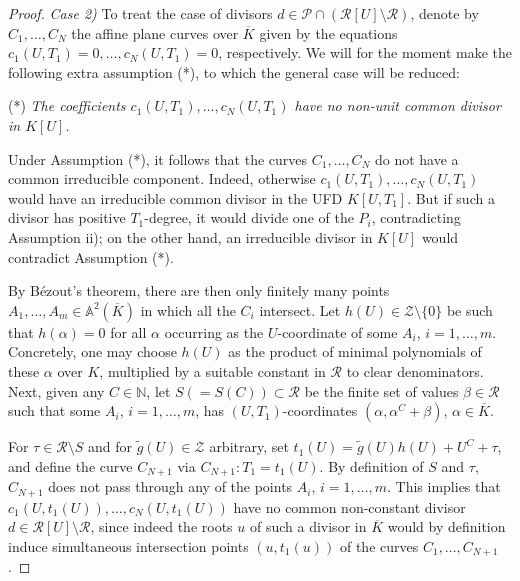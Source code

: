 \documentclass[11pt,a4paper,reqno]{amsart}
\theoremstyle{definition}
\begin{document}
\begin{proof}
\noindent
\emph{Case 2)} To treat the case of divisors $d\in \mathcal{P}\cap(\mathcal R[U]\setminus \mathcal R)$, denote by $C_1,\dots, C_N$ the affine plane curves over $\overline{K}$ given by the equations $c_1(U,T_1)=0,\dots, c_N(U,T_1)=0$, respectively. 
We will for the moment make the following extra assumption (*), to which the general case will be reduced:


\vskip 1mm
\noindent
(*) \emph{The coefficients $c_1(U,T_1),\dots, c_N(U,T_1)$ have no non-unit common divisor in $K[U]$.}

\vskip 1mm

Under Assumption (*), it follows that the curves $C_1,\dots, C_N$ do not have a common irreducible component. Indeed, otherwise $c_1(U,T_1),\dots, c_N(U,T_1)$ would have an irreducible common divisor in the UFD $K[U,T_1]$. But if such a divisor has positive $T_1$-degree, it would divide one of the $P_i$, contradicting Assumption ii);
on the other hand, an irreducible divisor in $K[U]$ would contradict Assumption (*).

By B\'ezout's theorem, there are then only finitely many points  $A_1,\dots, A_m\in \mathbb{A}^2(\overline{K})$ in which all the $C_i$ intersect.
Let $h(U)\in \mathcal{Z}\setminus\{0\}$ be such that $h(\alpha)=0$ for all $\alpha$ occurring as the $U$-coordinate of some $A_i$, $i=1,\dots, m$. Concretely, one may choose $h(U)$ as the product of minimal polynomials of these $\alpha$ over $K$, multiplied by a suitable constant in $\mathcal{R}$ to clear denominators. 
Next, given any $C\in \mathbb{N}$, let $S (=S(C))\subset \mathcal{R}$ be the finite set of values $\beta\in\mathcal{R}$ such that some $A_i$, $i=1,\dots, m$, has $(U,T_1)$-coordinates $(\alpha, \alpha^C + \beta)$, $\alpha\in \overline{K}$.

For $\tau\in \mathcal{R}\setminus S$ and for
$\tilde{g}(U)\in \mathcal{Z}$ arbitrary, set $t_1(U) = \tilde{g}(U)h(U) + U^C + \tau$, and define the curve $C_{N+1}$ via $C_{N+1}: T_1 = t_1(U)$. By definition of $S$ and $\tau$, $C_{N+1}$ does not pass through any of the points $A_i$, $i=1,\dots, m$. This implies that $c_1(U,t_1(U)),\dots, c_N(U,t_1(U))$ have no common non-constant divisor $d\in \mathcal{R}[U]\setminus \mathcal{R}$, since indeed the roots $u$ of such a divisor in $\overline{K}$ would by definition induce simultaneous intersection points $(u,t_1(u))$ of the curves $C_1,\dots, C_{N+1}$. 



\end{proof}
\end{document}
